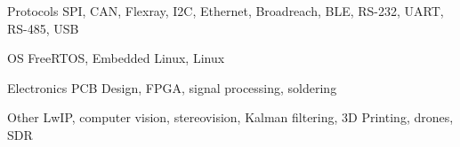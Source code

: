 


\begin{cvskills}


\cvskill
{Protocols} %
{SPI, CAN, Flexray, I2C, Ethernet, Broadreach, BLE, RS-232, UART, RS-485, USB} %


\cvskill
{OS} %
{FreeRTOS, Embedded Linux, Linux} %


\cvskill
{Electronics} %
{PCB Design, FPGA, signal processing, soldering} %


\cvskill
{Other} %
{LwIP, computer vision, stereovision, Kalman filtering, 3D Printing, drones, SDR} %


\end{cvskills}